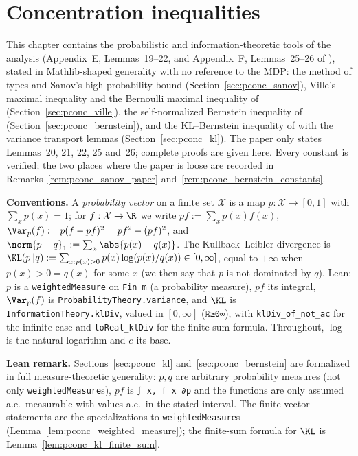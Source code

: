 \chapter{Concentration inequalities}
\label{chap:pre_concentration}

This chapter contains the probabilistic and information-theoretic tools of the analysis
(Appendix~E, Lemmas~19--22, and Appendix~F, Lemmas~25--26 of \cite{essakine2026tight}), stated in
Mathlib-shaped generality with no reference to the MDP: the method of types and Sanov's
high-probability bound (Section~\ref{sec:pconc_sanov}), Ville's maximal inequality and the
Bernoulli maximal inequality of \cite{dann2017unifying} (Section~\ref{sec:pconc_ville}), the
self-normalized Bernstein inequality of \cite{menard2021fast} (Section~\ref{sec:pconc_bernstein}),
and the KL--Bernstein inequality of \cite{talebi2018variance} with the variance transport lemmas
(Section~\ref{sec:pconc_kl}). The paper only states Lemmas~20, 21, 22, 25 and~26; complete proofs
are given here. Every constant is verified; the two places where the paper is loose are recorded
in Remarks~\ref{rem:pconc_sanov_paper} and~\ref{rem:pconc_bernstein_constants}.

\textbf{Conventions.} A \emph{probability vector} on a finite set $\mathcal X$ is a map
$p : \mathcal X \to [0, 1]$ with $\sum_x p(x) = 1$; for $f : \mathcal X \to \R$ we write
$pf := \sum_x p(x) f(x)$, $\Var_p(f) := p(f - pf)^2 = pf^2 - (pf)^2$, and
$\norm{p - q}_1 := \sum_x \abs{p(x) - q(x)}$. The Kullback--Leibler divergence is
$\KL(p \| q) := \sum_{x : p(x) > 0} p(x) \log(p(x)/q(x)) \in [0, \infty]$, equal to $+\infty$ when
$p(x) > 0 = q(x)$ for some $x$ (we then say that $p$ is not dominated by $q$). Lean: $p$ is a
\texttt{weightedMeasure} on \texttt{Fin m} (a probability measure), $pf$ its integral,
$\Var_p(f)$ is \texttt{ProbabilityTheory.variance}, and $\KL$ is
\texttt{InformationTheory.klDiv}, valued in $[0, \infty]$ (\texttt{ℝ≥0∞}), with
\texttt{klDiv\_of\_not\_ac} for the infinite case and \texttt{toReal\_klDiv} for the finite-sum
formula. Throughout, $\log$ is the natural logarithm and $e$ its base.

\textbf{Lean remark.} Sections~\ref{sec:pconc_kl} and~\ref{sec:pconc_bernstein} are formalized in
full measure-theoretic generality: $p, q$ are arbitrary probability measures (not only
\texttt{weightedMeasure}s), $pf$ is \texttt{∫ x, f x ∂p} and the functions are only assumed
a.e.\ measurable with values a.e.\ in the stated interval. The finite-vector statements are the
specializations to \texttt{weightedMeasure}s (Lemma~\ref{lem:pconc_weighted_measure}); the
finite-sum formula for $\KL$ is Lemma~\ref{lem:pconc_kl_finite_sum}.

